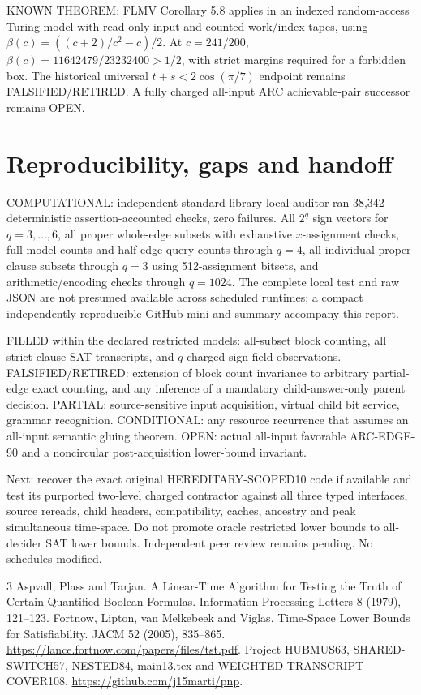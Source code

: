 \documentclass[11pt]{article}
\begin{document}
KNOWN THEOREM: FLMV Corollary 5.8 applies in an indexed random-access Turing model with read-only input and counted work/index tapes, using $\beta(c)=((c+2)/c^2-c)/2$. At $c=241/200$, $\beta(c)=11642479/23232400>1/2$, with strict margins required for a forbidden box. The historical universal $t+s<2\cos(\pi/7)$ endpoint remains FALSIFIED/RETIRED. A fully charged all-input ARC achievable-pair successor remains OPEN.
\section{Reproducibility, gaps and handoff}
COMPUTATIONAL: independent standard-library local auditor ran 38,342 deterministic assertion-accounted checks, zero failures. All $2^q$ sign vectors for $q=3,\ldots,6$, all proper whole-edge subsets with exhaustive $x$-assignment checks, full model counts and half-edge query counts through $q=4$, all individual proper clause subsets through $q=3$ using 512-assignment bitsets, and arithmetic/encoding checks through $q=1024$. The complete local test and raw JSON are not presumed available across scheduled runtimes; a compact independently reproducible GitHub mini and summary accompany this report.

FILLED within the declared restricted models: all-subset block counting, all strict-clause SAT transcripts, and $q$ charged sign-field observations. FALSIFIED/RETIRED: extension of block count invariance to arbitrary partial-edge exact counting, and any inference of a mandatory child-answer-only parent decision. PARTIAL: source-sensitive input acquisition, virtual child bit service, grammar recognition. CONDITIONAL: any resource recurrence that assumes an all-input semantic gluing theorem. OPEN: actual all-input favorable ARC-EDGE-90 and a noncircular post-acquisition lower-bound invariant.

Next: recover the exact original HEREDITARY-SCOPED10 code if available and test its purported two-level charged contractor against all three typed interfaces, source rereads, child headers, compatibility, caches, ancestry and peak simultaneous time-space. Do not promote oracle restricted lower bounds to all-decider SAT lower bounds. Independent peer review remains pending. No schedules modified.

\begin{thebibliography}{3}
 Aspvall, Plass and Tarjan. A Linear-Time Algorithm for Testing the Truth of Certain Quantified Boolean Formulas. Information Processing Letters 8 (1979), 121--123.
 Fortnow, Lipton, van Melkebeek and Viglas. Time-Space Lower Bounds for Satisfiability. JACM 52 (2005), 835--865. \url{https://lance.fortnow.com/papers/files/tst.pdf}.
 Project HUBMUS63, SHARED-SWITCH57, NESTED84, main13.tex and WEIGHTED-TRANSCRIPT-COVER108. \url{https://github.com/j15marti/pnp}.
\end{thebibliography}
\end{document}
